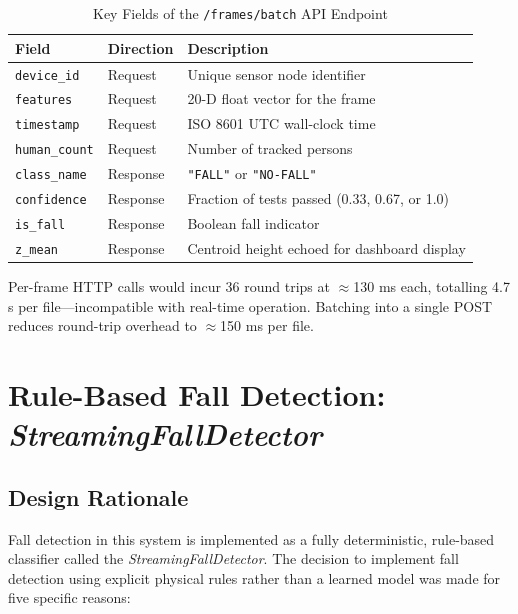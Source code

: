 \begin{table}[H]
\caption{Key Fields of the \texttt{/frames/batch} API Endpoint}
\label{tab:summary_5}
\centering
\begin{tabularx}{\textwidth}{@{} l X X @{}}
\toprule
\textbf{Field} & \textbf{Direction} & \textbf{Description} \\ \midrule
\texttt{device\_id} & Request & Unique sensor node identifier \\
\texttt{features} & Request & 20-D float vector for the frame \\
\texttt{timestamp} & Request & ISO 8601 UTC wall-clock time \\
\texttt{human\_count} & Request & Number of tracked persons \\
\texttt{class\_name} & Response & \texttt{"FALL"} or \texttt{"NO-FALL"} \\
\texttt{confidence} & Response & Fraction of tests passed (0.33, 0.67, or 1.0) \\
\texttt{is\_fall} & Response & Boolean fall indicator \\
\texttt{z\_mean} & Response & Centroid height echoed for dashboard display \\ \bottomrule
\end{tabularx}
\end{table}



Per-frame HTTP calls would incur 36 round trips at $\approx$130 ms each, totalling 4.7 s per file---incompatible with real-time operation. Batching into a single POST reduces round-trip overhead to $\approx$150 ms per file.


\section{Rule-Based Fall Detection: \textit{StreamingFallDetector}}

\subsection{Design Rationale}

Fall detection in this system is implemented as a fully deterministic, rule-based classifier called the \textit{StreamingFallDetector}. The decision to implement fall detection using explicit physical rules rather than a learned model was made for five specific reasons:


